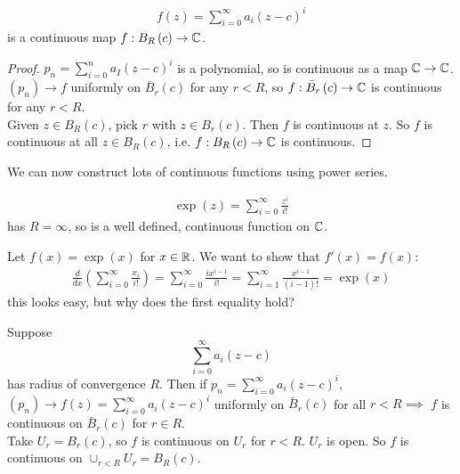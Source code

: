 \documentclass[a4paper]{article}
\begin{document}
\begin{coro}
\begin{equation*}
\begin{aligned}
f\left(z\right) = \sum_{i=0}^\infty a_i\left(z-c\right)^i
\end{aligned}
\end{equation*}
is a continuous map $f:B_R\left(c\right) \to \mathbb{C}$.
\begin{proof}
$p_n = \sum_{i=0}^n a_I\left(z-c\right)^i$ is a polynomial, so is continuous as a map $\mathbb{C} \to \mathbb{C}$. $\left(p_n\right) \to f$ uniformly on $\bar{B}_r\left(c\right)$ for any $r<R$, so $f:\bar{B}_r\left(c\right) \to \mathbb{C}$ is continuous for any $r<R$. \\
Given $z \in B_R\left(c\right)$, pick $r$ with $z \in B_r\left(c\right)$. Then $f$ is continuous at $z$. So $f$ is continuous at all $z \in B_R\left(c\right)$, i.e. $f:B_R\left(c\right) \to \mathbb{C}$ is continuous.
\end{proof}
\end{coro}

We can now construct lots of continuous functions using power series.

\begin{eg}
\begin{equation*}
\begin{aligned}
\exp\left(z\right) = \sum_{i=0}^\infty \frac{z^i}{i!}
\end{aligned}
\end{equation*}
has $R = \infty$, so is a well defined, continuous function on $\mathbb{C}$.
\end{eg}

Let $f\left(x\right) = \exp\left(x\right)$ for $x \in \mathbb{R}$. We want to show that $f'\left(x\right) = f\left(x\right)$:
\begin{equation*}
\begin{aligned}
\frac{d}{dx}\left(\sum_{i=0}^\infty \frac{x_i}{i!}\right) = \sum_{i=0}^\infty \frac{ix^{i-1}}{i!} = \sum_{i=1}^\infty \frac{x^{i-1}}{\left(i-1\right)!} = \exp\left(x\right)
\end{aligned}
\end{equation*}
this looks easy, but why does the first equality hold?

\begin{eg}
Suppose $$\sum_{i=0}^\infty a_i\left(z-c\right)$$ has radius of convergence $R$. Then if $p_n = \sum_{i=0}^\infty a_i \left(z-c\right)^i$, $\left(p_n\right) \to f\left(z\right) = \sum_{i=0}^\infty a_i\left(z-c\right)^i$ uniformly on $\bar{B}_r\left(c\right)$ for all $r<R \implies$ $f$ is continuous on $\bar{B}_r\left(c\right)$ for $r\in R$.\\
Take $U_r = B_r\left(c\right)$, so $f$ is continuous on $U_r$ for $r<R$. $U_r$ is open. So $f$ is continuous on $\cup_{r<R} U_r = B_R\left(c\right)$.
\end{eg}
\end{document}
